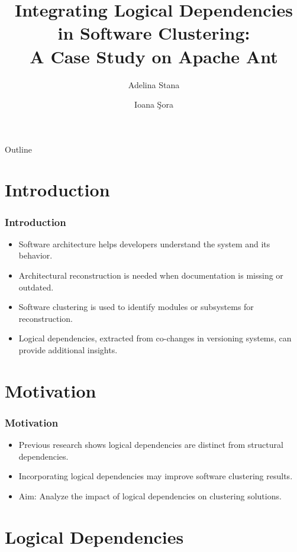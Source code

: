 \documentclass{beamer}
\title[Pres]{Integrating Logical Dependencies in Software Clustering:\\ A Case Study on Apache Ant}
\author{Adelina Stana \and Ioana Şora}
\institute{Computer Science and Engineering Department\\
"Politehnica" University of Timișoara, Romania}
\date{}
\begin{document}
\begin{frame}
  \titlepage
\end{frame}

\begin{frame}{Outline}
  \tableofcontents
\end{frame}

\section{Introduction}

\begin{frame}
\frametitle{Introduction}
\begin{itemize}
    \item Software architecture helps developers understand the system and its behavior.
    \item Architectural reconstruction is needed when documentation is missing or outdated.
    \item Software clustering is used to identify modules or subsystems for reconstruction.
    \item Logical dependencies, extracted from co-changes in versioning systems, can provide additional insights.
\end{itemize}
\end{frame}

\section{Motivation}

\begin{frame}
\frametitle{Motivation}
\begin{itemize}
    \item Previous research shows logical dependencies are distinct from structural dependencies.
    \item Incorporating logical dependencies may improve software clustering results.
    \item Aim: Analyze the impact of logical dependencies on clustering solutions.
\end{itemize}
\end{frame}

\section{Logical Dependencies}
\end{document}
